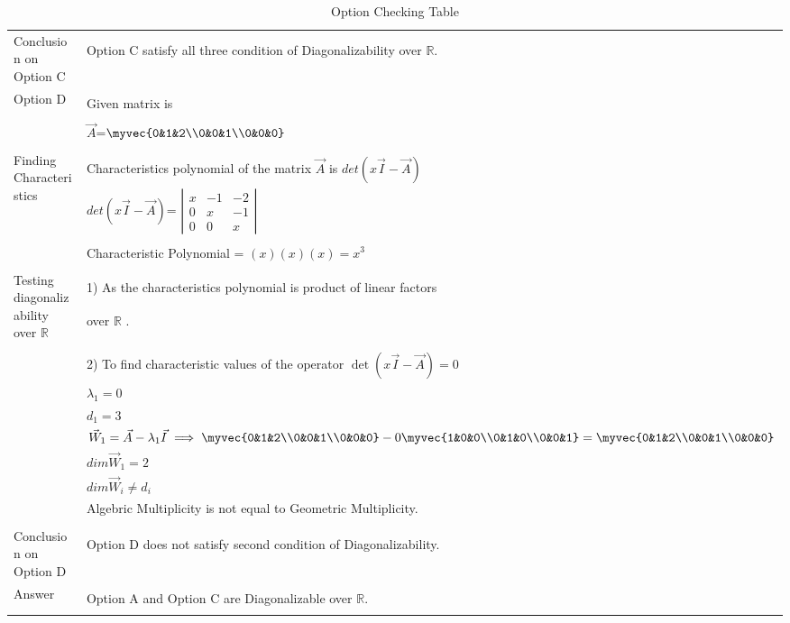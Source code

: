 \begin{longtable}{|l|l|}
&\\
\hline
\multirow{3}{*}{Conclusion on Option C} & \\
& Option C satisfy all three condition of Diagonalizability over $\mathbb{R}$. \\
&\\
\hline
\multirow{3}{*}{Option D} & \\
& Given matrix is  \\
&\\
& $\vec{A}$=$\myvec{0&1&2\\0&0&1\\0&0&0}$\\
&\\
\hline
\multirow{3}{*}{Finding Characteristics} & \\
&Characteristics polynomial of the matrix $\vec{A}$ is $det(x\vec{I}-\vec{A})$\\ 
polynomial
& $det(x\vec{I}-\vec{A})$= $\left|
                \begin{array}{ccc}
                x & -1 & -2\\
                0 & x & -1\\
                0 & 0 & x
                \end{array} \right|$  \\
&\\
& Characteristic Polynomial = $(x)(x)(x)=x^3$\\
&\\
\hline
\multirow{3}{*}{Testing diagonalizability over $\mathbb{R}$} & \\
& 1) As the characteristics  polynomial is product of linear factors\\
&over $\mathbb{R}$ .\\
&\\
&2) To find characteristic values of the operator $\det(x\vec{I}-\vec{A}) = 0$ \\
& $\lambda_1= 0$\\
&$d_1=3$\\
&$\vec{W}_1=\vec{A}-\lambda_1\vec{I}\implies\myvec{0&1&2\\0&0&1\\0&0&0}-0\myvec{1&0&0\\0&1&0\\0&0&1}=\myvec{0&1&2\\0&0&1\\0&0&0}$\\

&$dim \vec{W}_1 = 2$\\
&$dim \vec{W}_i \neq d_i$\\
&Algebric Multiplicity is not equal to Geometric Multiplicity.\\
&\\
\hline
\multirow{3}{*}{Conclusion on Option D} & \\
& Option D  does not satisfy second condition of Diagonalizability.\\
&\\
\hline \hline
\multirow{3}{*}{Answer} & \\
&Option A and Option C are Diagonalizable over $\mathbb{R}$.\\

\hline
\caption{Option Checking Table}
\label{table:2}
\end{longtable}
